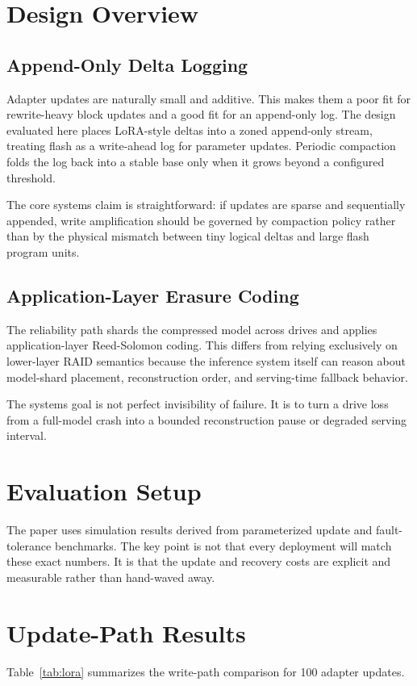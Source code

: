 \documentclass[11pt]{article}
\begin{document}
\section{Design Overview}
\subsection{Append-Only Delta Logging}
Adapter updates are naturally small and additive. This makes them a poor fit for rewrite-heavy block updates and a good fit for an append-only log. The design evaluated here places LoRA-style deltas into a zoned append-only stream, treating flash as a write-ahead log for parameter updates. Periodic compaction folds the log back into a stable base only when it grows beyond a configured threshold.

The core systems claim is straightforward: if updates are sparse and sequentially appended, write amplification should be governed by compaction policy rather than by the physical mismatch between tiny logical deltas and large flash program units.

\subsection{Application-Layer Erasure Coding}
The reliability path shards the compressed model across drives and applies application-layer Reed-Solomon coding. This differs from relying exclusively on lower-layer RAID semantics because the inference system itself can reason about model-shard placement, reconstruction order, and serving-time fallback behavior.

The systems goal is not perfect invisibility of failure. It is to turn a drive loss from a full-model crash into a bounded reconstruction pause or degraded serving interval.

\section{Evaluation Setup}
The paper uses simulation results derived from parameterized update and fault-tolerance benchmarks. The key point is not that every deployment will match these exact numbers. It is that the update and recovery costs are explicit and measurable rather than hand-waved away.

\section{Update-Path Results}
Table~\ref{tab:lora} summarizes the write-path comparison for 100 adapter updates.
\end{document}
